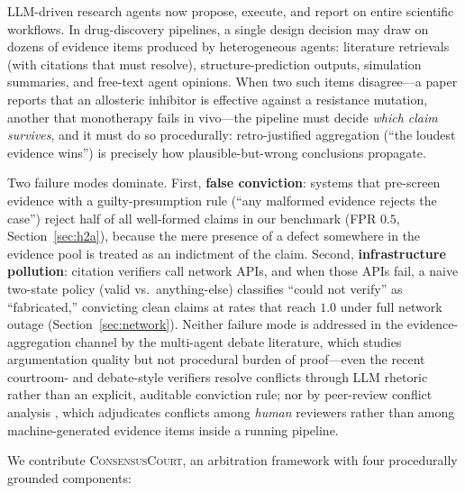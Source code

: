 \documentclass[11pt]{article}
\newcommand{\court}{\textsc{ConsensusCourt}}
\begin{document}
LLM-driven research agents now propose, execute, and report on entire
scientific workflows. In drug-discovery pipelines, a single design decision
may draw on dozens of evidence items produced by heterogeneous agents:
literature retrievals (with citations that must resolve), structure-prediction
outputs, simulation summaries, and free-text agent opinions. When two such
items disagree—a paper reports that an allosteric inhibitor is effective
against a resistance mutation, another that monotherapy fails in vivo—the
pipeline must decide \emph{which claim survives}, and it must do so
procedurally: retro-justified aggregation (``the loudest evidence wins'') is
precisely how plausible-but-wrong conclusions propagate.

Two failure modes dominate. First, \textbf{false conviction}: systems that
pre-screen evidence with a guilty-presumption rule (``any malformed evidence
rejects the case'') reject half of all well-formed claims in our benchmark
(FPR $0.5$, Section~\ref{sec:h2a}), because the mere presence of a defect
somewhere in the evidence pool is treated as an indictment of the claim.
Second, \textbf{infrastructure pollution}: citation verifiers call network
APIs, and when those APIs fail, a naive two-state policy (valid vs.\
anything-else) classifies ``could not verify'' as ``fabricated,'' convicting
clean claims at rates that reach $1.0$ under full network outage
(Section~\ref{sec:network}). Neither failure mode is addressed in the
evidence-aggregation channel by the multi-agent debate literature, which
studies argumentation quality but not procedural burden of proof—even the
recent courtroom- and debate-style verifiers
\citep{chowdhury2026proclaim,he2026debatecv} resolve conflicts through LLM
rhetoric rather than an explicit, auditable conviction rule; nor by
peer-review conflict analysis
\citep{kumar2026when,cecil2026beyond}, which adjudicates conflicts among
\emph{human} reviewers rather than among machine-generated evidence items
inside a running pipeline.

We contribute \court{}, an arbitration framework with four procedurally
grounded components:
\end{document}
